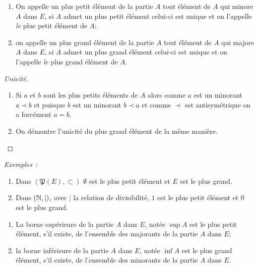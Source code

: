 \begin{defdef}
    \begin{enumerate}
        \item On appelle un plus petit élément de la partie \(A\) tout élément 
            de \(A\) qui minore \(A\) dans \(E\), si \(A\) admet un plus petit 
            élément celui-ci est unique et on l'appelle \emph{le} plus petit 
            élément de \(A\);
        \item on appelle un plus grand élément de la partie \(A\) tout élément 
            de \(A\) qui majore \(A\) dans \(E\), si \(A\) admet un plus grand 
            élément celui-ci est unique et on l'appelle \emph{le} plus grand 
            élément de \(A\).
    \end{enumerate}
\end{defdef}

\begin{proof}[Unicité]
    \begin{enumerate}
        \item Si \(a\) et \(b\) sont les plus petits éléments de \(A\) alors 
            comme \(a\) est un minorant \(a \prec b\) et puisque \(b\) est un 
            minorant \(b \prec a\) et comme \(\prec\) est antisymétrique on a 
            forcément \(a = b\).
        \item On démontre l'unicité du plus grand élément de la même manière.
    \end{enumerate}
\end{proof}

\emph{Exemples}~:
\begin{enumerate}
    \item Dans \((\mathfrak{P}(E), \subset)\) \(\emptyset\) est le plus petit 
        élément et \(E\) est le plus grand.
    \item Dans \((\mathbb{N},|)\), avec \(|\) la relation de divisibilité, \(1\) est le 
        plus petit élément et \(0\) est le plus grand.
\end{enumerate}

\begin{defdef}
    \begin{enumerate}
        \item La borne supérieure de la partie \(A\) dans \(E\), notée \(\sup 
            A\) est le plus petit élément, s'il existe, de l'ensemble des 
            majorants de la partie \(A\) dans \(E\);
        \item la borne inférieure de la partie \(A\) dans \(E\), notée \(\inf 
            A\) est le plus grand élément, s'il existe, de l'ensemble des 
            minorants de la partie \(A\) dans \(E\).
    \end{enumerate}
\end{defdef}

